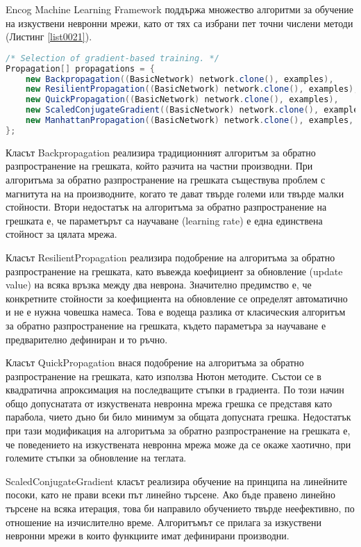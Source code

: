 Encog Machine Learning Framework поддържа множество алгоритми за обучение на изкуствени невронни мрежи, като от тях са избрани пет точни числени методи (Листинг \ref{list0021}).

\begin{lstlisting}[caption=Набор от точни числени методи, language=Java, basicstyle=\tiny, label=list0021]
/* Selection of gradient-based training. */
Propagation[] propagations = {
	new Backpropagation((BasicNetwork) network.clone(), examples),
	new ResilientPropagation((BasicNetwork) network.clone(), examples),
	new QuickPropagation((BasicNetwork) network.clone(), examples),
	new ScaledConjugateGradient((BasicNetwork) network.clone(), examples),
	new ManhattanPropagation((BasicNetwork) network.clone(), examples, PRNG.nextDouble())
};
\end{lstlisting}

Класът Backpropagation реализира традиционният алгоритъм за обратно разпространение на грешката, който разчита на частни производни. При алгоритъма за обратно разпространение на грешката съществува проблем с магнитута на на производните, когато те дават твърде големи или твърде малки стойности. Втори недостатък на алгоритъма за обратно разпространение на грешката е, че параметърът са научаване (learning rate) е една единствена стойност за цялата мрежа. 

Класът ResilientPropagation реализира подобрение на алгоритъма за обратно разпространение на грешката, като въвежда коефициент за обновление (update value) на всяка връзка между два неврона. Значително предимство е, че конкретните стойности за коефициента на обновление се определят автоматично и не е нужна човешка намеса. Това е водеща разлика от класическия алгоритъм за обратно разпространение на грешката, където параметъра за научаване е предварително дефиниран и то ръчно. 

Класът QuickPropagation внася подобрение на алгоритъма за обратно разпространение на грешката, като използва Нютон методите. Състои се в квадратична апроксимация на последващите стъпки в градиента. По този начин общо допуснатата от изкуствената невронна мрежа грешка се представя като парабола, чието дъно би било минимум за общата допусната грешка. Недостатък при тази модификация на алгоритъма за обратно разпространение на грешката е, че поведението на изкуствената невронна мрежа може да се окаже хаотично, при големите стъпки за обновление на теглата. 

ScaledConjugateGradient класът реализира обучение на принципа на линейните посоки, като не прави всеки път линейно търсене. Ако бъде правено линейно търсене на всяка итерация, това би направило обучението твърде неефективно, по отношение на изчислително време. Алгоритъмът се прилага за изкуствени невронни мрежи в които функциите имат дефинирани производни. 

